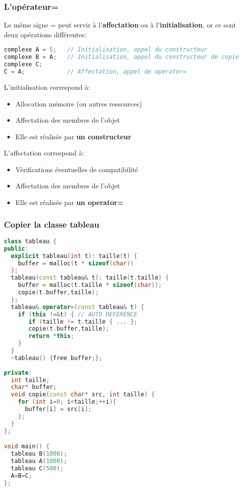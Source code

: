 \documentclass{beamer}
\begin{document}
\begin{frame}[fragile=singleslide,shrink=20]
\frametitle {L'opérateur=}

Le même signe = peut servir à l'\textbf{affectation} ou à l'\textbf{initialisation}, or ce sont deux opérations différentes:
\begin{lstlisting}[language=c++]
complexe A = 5;   // Initialisation, appel du constructeur
complexe B = A;   // Initialisation, appel du constructeur de copie
complexe C; 
C = A;            // Affectation, appel de operator=
\end{lstlisting}

L'initialisation correspond à:
\begin{itemize}
\item{Allocation mémoire (ou autres ressources)}
\item{Affectation des membres de l'objet}
\item{Elle est réalisée par \textbf{un constructeur}}
\end{itemize}

L'affectation correspond à:
\begin{itemize}
\item{Vérifications éventuelles de compatibilité}
\item{Affectation des membres de l'objet}
\item{Elle est réalisée par \textbf{un operator=}}
\end{itemize}

\end{frame}

\begin{frame}[fragile=singleslide,shrink=20]
\frametitle {Copier la classe tableau}
\begin{lstlisting}[language=c++]
class tableau {
public:
  explicit tableau(int t): taille(t) {
    buffer = malloc(t * sizeof(char))
  };
  tableau(const tableau& t): taille(t.taille) {
    buffer = malloc(t.taille * sizeof(char));
    copie(t.buffer,taille);
  };
  tableau& operator=(const tableau& t) {
    if (this !=&t) { // AUTO REFERENCE
       if (taille != t.taille { ... };
       copie(t.buffer,taille);
       return *this;
    }
  }
  ~tableau() {free buffer;};
  
private:
  int taille;
  char* buffer;
  void copie(const char* src, int taille) {
    for (int i=0; i<taille;++i){
      buffer[i] = src[i]; 
    };
  }
};

void main() {
  tableau B(1000);
  tableau A(1000);
  tableau C(500);
  A=B=C;
};
\end{lstlisting}
\end{frame}
\end{document}
